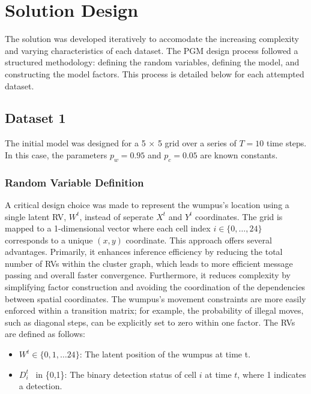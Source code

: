 \documentclass[10pt]{article}
\begin{document}
\section{Solution Design}
\label{sec:solDesign}
The solution was developed iteratively to accomodate the increasing complexity and varying characteristics of each dataset. The 
PGM design process followed a structured methodology: defining the random variables, defining the model, and constructing the model factors. 
This process is detailed below for each attempted dataset.

\subsection{Dataset 1}
The initial model was designed for a 5 $\times$ 5 grid over a series of $T = 10$ time steps. In this case, 
the parameters $p_w = 0.95$ and $p_c = 0.05$ are known constants.
\subsubsection{Random Variable Definition}
A critical design choice was made to represent the wumpus's location using a single latent RV, $W^t$, instead of seperate 
$X^t$ and $Y^t$ coordinates. The grid is mapped to a 1-dimensional vector where each cell index $i \in \{0, \dots, 24\}$ 
corresponds to a unique $(x,y)$ coordinate. This approach offers several advantages. Primarily, it enhances inference efficiency by reducing the total number of RVs within the 
cluster graph, which leads to more efficient message passing and overall faster convergence. Furthermore, it reduces complexity by simplifying 
factor construction and avoiding the coordination of the dependencies between spatial coordinates. The wumpus's 
movement constraints are more easily enforced within a transition matrix; for example, the probability of illegal moves, such as diagonal steps, 
can be explicitly set to zero within one factor. The RVs are defined as follows: 

\begin{itemize}
  \item $W^t \in \{0,1, \ldots 24\}$: The latent position of the wumpus at time t.
  \item $D^t_i$ \ in \{0,1\}: The binary detection status of cell $i$ at time $t$, where 1 indicates a detection.
\end{itemize}
\end{document}

